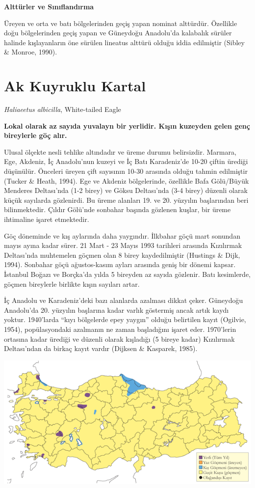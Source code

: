 \documentclass[
  a4paper,
  DIV=11,
  numbers=noendperiod]{scrreprt}
\begin{document}
\textbf{Alttürler ve Sınıflandırma}

Üreyen ve orta ve batı bölgelerinden geçiş yapan nominat alttürdür.
Özellikle doğu bölgelerinden geçiş yapan ve Güneydoğu Anadolu'da
kalabalık sürüler halinde kışlayanların öne sürülen lineatus alttürü
olduğu iddia edilmiştir (Sibley \& Monroe, 1990).

\section{Ak Kuyruklu Kartal}\label{ak-kuyruklu-kartal}

\emph{Haliaeetus albicilla}, White-tailed Eagle

\textbf{Lokal olarak az sayıda yuvalayn bir yerlidir. Kışın kuzeyden
gelen genç bireylerle göç alır.}

Ulusal ölçekte nesli tehlike altındadır ve üreme durumu belirsizdir.
Marmara, Ege, Akdeniz, İç Anadolu'nun kuzeyi ve İç Batı Karadeniz'de
10-20 çiftin ürediği düşünülür. Önceleri üreyen çift sayısının 10-30
arasında olduğu tahmin edilmiştir (Tucker \& Heath, 1994). Ege ve
Akdeniz bölgelerinde, özellikle Bafa Gölü/Büyük Menderes Deltası'nda
(1-2 birey) ve Göksu Deltası'nda (3-4 birey) düzenli olarak küçük
sayılarda gözlenirdi. Bu üreme alanları 19. ve 20. yüzyılın başlarından
beri bilinmektedir. Çıldır Gölü'nde sonbahar başında gözlenen kuşlar,
bir üreme ihtimaline işaret etmektedir.

Göç döneminde ve kış aylarında daha yaygındır. İlkbahar göçü mart
sonundan mayıs ayına kadar sürer. 21 Mart - 23 Mayıs 1993 tarihleri
arasında Kızılırmak Deltası'nda muhtemelen göçmen olan 8 birey
kaydedilmiştir (Hustings \& Dijk, 1994). Sonbahar göçü ağustos-kasım
ayları arasında geniş bir dönemi kapsar. İstanbul Boğazı ve Borçka'da
yılda 5 bireyden az sayıda gözlenir. Batı kesimlerde, göçmen bireylerle
birlikte kışın sayıları artar.

İç Anadolu ve Karadeniz'deki bazı alanlarda azalması dikkat çeker.
Güneydoğu Anadolu'da 20. yüzyılın başlarına kadar varlık göstermiş ancak
artık kaydı yoktur. 1940'larda ``kıyı bölgelerde epey yaygın'' olduğu
belirtilen kayıt (Ogilvie, 1954), popülasyondaki azalmanın ne zaman
başladığını işaret eder. 1970'lerin ortasına kadar ürediği ve düzenli
olarak kışladığı (5 bireye kadar) Kızılırmak Deltası'ndan da birkaç
kayıt vardır (Dijksen \& Kasparek, 1985).

\includegraphics{images/harita_Page_108.png}
\end{document}
